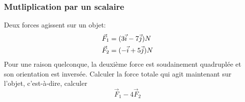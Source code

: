 \documentclass{beamer}
\begin{document}
\begin{frame}
  \frametitle{Mutliplication par un scalaire}
  Deux forces agissent sur un objet:
  \begin{align*}
    \vec{F}_1 &= (3 \vec{i} - 7 \vec{j}) N \\
    \vec{F}_2 &= (- \vec{i} + 5 \vec{j}) N
  \end{align*}
  Pour une raison quelconque, la deuxième force est soudainement quadruplée et
  son orientation est inversée.  Calculer la force totale qui agit maintenant
  sur l'objet, c'est-à-dire, calculer
  \[
    \vec{F}_1 - 4\vec{F}_2
  \]
\end{frame}
\end{document}
